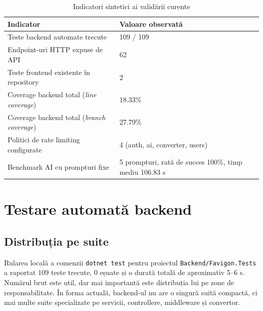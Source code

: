 \begin{table}[H]
  \centering
  \caption{Indicatori sintetici ai validării curente}
  \label{tab:indicatori-validare-sinteza}
  \renewcommand{\arraystretch}{1.15}
  \begin{tabularx}{\textwidth}{>{\RaggedRight\arraybackslash}p{6.2cm}Y}
    \toprule
    \textbf{Indicator} & \textbf{Valoare observată} \\
    \midrule
    Teste backend automate trecute & 109 / 109 \\
    Endpoint-uri HTTP expuse de API & 62 \\
    Teste frontend existente în repository & 2 \\
    Coverage backend total (\textit{line coverage}) & 18.33\% \\
    Coverage backend total (\textit{branch coverage}) & 27.79\% \\
    Politici de rate limiting configurate & 4 (auth, ai, converter, users) \\
    Benchmark AI cu prompturi fixe & 5 prompturi, rată de succes 100\%, timp mediu 106.83 s \\
    \bottomrule
  \end{tabularx}
\end{table}

\section{Testare automată backend}

\subsection{Distribuția pe suite}

Rularea locală a comenzii \texttt{dotnet test} pentru proiectul \texttt{Backend/Favigon.Tests} a raportat 109 teste trecute, 0 eșuate și o durată totală de aproximativ 5--6 s. Numărul brut este util, dar mai importantă este distribuția lui pe zone de responsabilitate. În forma actuală, backend-ul nu are o singură suită compactă, ci mai multe suite specializate pe servicii, controllere, middleware și convertor.


